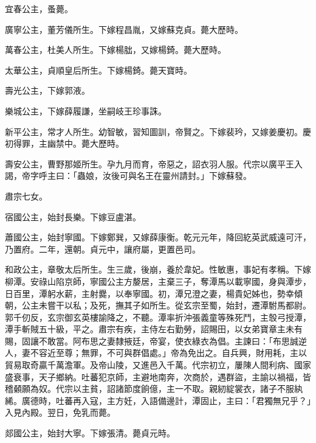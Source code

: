 \begin{pinyinscope}
 宜春公主，蚤薨。



 廣寧公主，董芳儀所生。下嫁程昌胤，又嫁蘇克貞。薨大歷時。



 萬春公主，杜美人所生。下嫁楊朏，又嫁楊錡。薨大歷時。



 太華公主，貞順皇后所生。下嫁楊錡。薨天寶時。



 壽光公主，下嫁郭液。



 樂城公主，下嫁薛履謙，坐嗣岐王珍事誅。



 新平公主，常才人所生。幼智敏，習知圖訓，帝賢之。下嫁裴玪，又嫁姜慶初。慶初得罪，主幽禁中。薨大歷時。



 壽安公主，曹野那姬所生。孕九月而育，帝惡之，詔衣羽人服。代宗以廣平王入謁，帝字呼主曰：「蟲娘，汝後可與名王在靈州請封。」下嫁蘇發。



 肅宗七女。



 宿國公主，始封長樂。下嫁豆盧湛。



 蕭國公主，始封寧國。下嫁鄭巽，又嫁薛康衡。乾元元年，降回紇英武威遠可汗，乃置府。二年，還朝。貞元中，讓府屬，更置邑司。



 和政公主，章敬太后所生。生三歲，後崩，養於韋妃。性敏惠，事妃有孝稱。下嫁柳潭。安祿山陷京師，寧國公主方嫠居，主棄三子，奪潭馬以載寧國，身與潭步，日百里，潭躬水薪，主射爨，以奉寧國。初，潭兄澄之妻，楊貴妃姊也，勢幸傾朝，公主未嘗干以私；及死，撫其子如所生。從玄宗至蜀，始封，遷潭駙馬都尉。郭千仞反，玄宗御玄英樓諭降之，不聽。潭率折沖張義童等殊死鬥，主彀弓授潭，潭手斬賊五十級，平之。肅宗有疾，主侍左右勤勞，詔賜田，以女弟寶章主未有賜，固讓不敢當。阿布思之妻隸掖廷，帝宴，使衣綠衣為倡。主諫曰：「布思誠逆人，妻不容近至尊；無罪，不可與群倡處。」帝為免出之。自兵興，財用耗，主以貿易取奇贏千萬澹軍。及帝山陵，又進邑入千萬。代宗初立，屢陳人間利病、國家盛衰事，天子鄉納。吐蕃犯京師，主避地南奔，次商於，遇群盜，主諭以禍福，皆稽顙願為奴。代宗以主貧，詔諸節度餉億，主一不取。親紉綻裳衣，諸子不服紈絺。廣德時，吐蕃再入寇，主方妊，入語備邊計，潭固止，主曰：「君獨無兄乎？」入見內殿。翌日，免乳而薨。



 郯國公主，始封大寧。下嫁張清。薨貞元時。




\end{pinyinscope}
